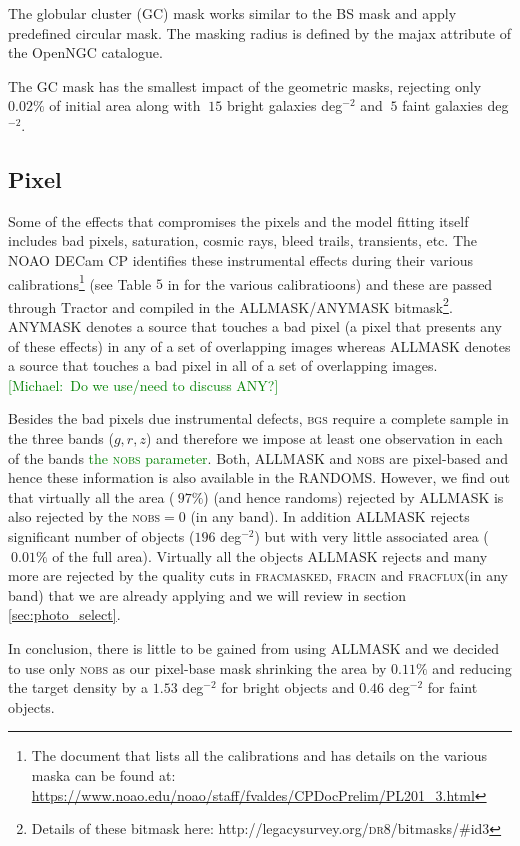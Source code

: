 \documentclass[fleqn,usenatbib]{mnras}
\newcommand{\mike}[1]{~\newline\noindent \textcolor{Green}{{ [Michael:~{#1}]\\}}}
\newcommand{\warn}[2]{\textcolor{Green}{\cancel{{ #1}} {#2}}}
\newcommand{\BGS}{\textsc{bgs}\xspace}
\newcommand{\DReight}{\textsc{dr8}\xspace}
\newcommand{\FRACMASK}{{\textsc{fracmasked}}\xspace}
\newcommand{\FRACFLUX}{{\textsc{fracflux}}\xspace}
\newcommand{\FRACIN}{{\textsc{fracin}}\xspace}
\newcommand{\NOBS}{\textsc{nobs}\xspace}
\newcommand{\TRACTOR}{\textsc{T}ractor\xspace}
\begin{document}
The globular cluster (GC) mask works similar to the BS mask and apply predefined circular mask. The masking radius is defined by the majax attribute of the OpenNGC catalogue.

The GC mask has the smallest impact of the geometric masks, rejecting only $0.02 \%$ of initial area along with  $~15$ bright galaxies deg$^{-2}$ and $~5$ faint galaxies deg$^{-2}$.

\subsection{Pixel}\label{subsec:pix_masking}
Some of the effects that compromises the pixels and the model fitting itself includes bad pixels, saturation, cosmic rays, bleed trails, transients, etc. The NOAO DECam CP identifies these instrumental effects during their various calibrations\footnote{The document that lists all the calibrations and has details on the various maska can be found at: \url{https://www.noao.edu/noao/staff/fvaldes/CPDocPrelim/PL201\_3.html}} (see Table $5$ in \citep{2019AJ....157..168D} for the various calibratioons) and these are passed through \TRACTOR and compiled in the ALLMASK/ANYMASK bitmask\footnote{Details of these bitmask here: http://legacysurvey.org/\DReight/bitmasks/\#id3}. ANYMASK denotes a source that touches a bad pixel (a pixel that presents any of these effects) in any of a set of overlapping images whereas ALLMASK denotes a source that touches a bad pixel in all of a set of overlapping images.
\mike{Do we use/need to discuss ANY?}

Besides the bad pixels due instrumental defects, \BGS require a complete sample in the three bands ($g, r, z$) and therefore we impose at least one observation in each of the bands \warn{, information we can get from}{the \NOBS parameter}. Both, ALLMASK and \NOBS are pixel-based and hence these information is also available in the RANDOMS. However, we find out that virtually all the area ($~97\%$) (and hence randoms) rejected by ALLMASK is also rejected by the \NOBS$=0$ (in any band). In addition ALLMASK rejects significant number of objects ($196$ deg$^{-2}$) but with very little associated area ($~0.01\%$ of the full area). Virtually all the objects ALLMASK rejects and many more are rejected by the quality cuts in \FRACMASK, \FRACIN and \FRACFLUX (in any band) that we are already applying and we will review in section \ref{sec:photo_select}. 

In conclusion, there is little to be gained from using ALLMASK and we decided to use only \NOBS as our pixel-base mask shrinking the area by $0.11 \%$ and reducing the target density by a $1.53$ deg$^{-2}$ for bright objects and $0.46$ deg$^{-2}$ for faint objects.
\end{document}
